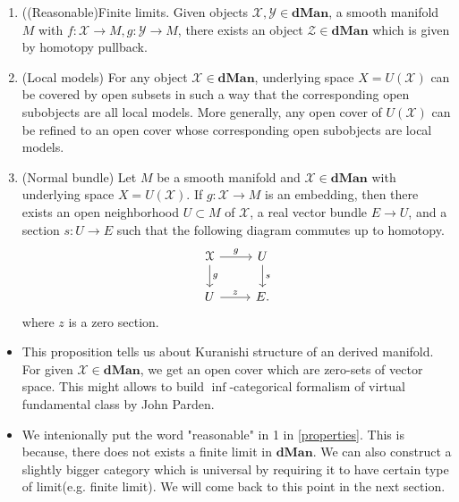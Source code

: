 \begin{prop}\label{properties}
    \begin{enumerate}
        \item ((Reasonable)Finite limits. Given objects $\mathcal{X}, \mathcal{Y} \in \textbf{dMan}$, a smooth manifold $M$ with $f:\mathcal{X} \to M, g:\mathcal{Y} \to M$, there exists an object $\mathcal{Z} \in \textbf{dMan}$ which is given by homotopy pullback.
        \item (Local models) For any object $\mathcal{X} \in \textbf{dMan}$, underlying space $X=U(\mathcal{X})$ can be covered by open subsets in such a way that the corresponding open subobjects are all local models. More generally, any open cover of $U(\mathcal{X})$ can be refined to an open cover whose corresponding open subobjects are local models.
        \item (Normal bundle) Let $M$ be a smooth manifold and $\mathcal{X} \in \textbf{dMan}$ with underlying space $X=U(\mathcal{X})$. If $g:\mathcal{X} \to M$ is an embedding, then there exists an open neighborhood $U \subset M$ of $\mathcal{X}$, a real vector bundle $E \to U$, and a section $s:U \to E$ such that the following diagram commutes up to homotopy.
        \[
    \begin{tikzcd}
    \mathcal{X} \arrow{r}{g}\arrow{d}{g} & U\arrow{d}{s} \\
    U \arrow{r}{z} & E.
    \end{tikzcd}
    \]
        where $z$ is a zero section.
    \end{enumerate}
\end{prop}
\begin{rem}
\begin{itemize}
    \item This proposition tells us about Kuranishi structure of an derived manifold. For given $\mathcal{X} \in \textbf{dMan}$, we get an open cover which are zero-sets of vector space. This might allows to build $\inf$-categorical formalism of virtual fundamental class by John Parden.
    \item We intenionally put the word "reasonable" in 1 in \ref{properties}. This is because, there does not exists a finite limit in $\textbf{dMan}$. We can also construct a slightly bigger category which is universal by requiring it to have certain type of limit(e.g. finite limit). We will come back to this point in the next section.
\end{itemize}
\end{rem}

